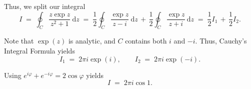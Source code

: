 \documentclass[10pt]{article}
\begin{document}
        Thus, we split our integral
        \[
        I \;=\; \oint_C \frac{z \exp{z}}{z^2 + 1} \:\mathrm{d}z \;=\; \frac{1}{2}\oint_C \frac{\exp{z}}{z - i} \:\mathrm{d}z 
                \,+\, \frac{1}{2}\oint_C \frac{\exp{z}}{z + i} \:\mathrm{d}z \;=\; \frac{1}{2}I_1 \,+\, \frac{1}{2}I_2.
        \]

        Note that $\exp(z)$ is analytic, and $C$ contains both $i$ and $-i$. Thus, Cauchy's Integral Formula yields
        \[
        I_1 \;=\; 2\pi i \exp(i), \quad\quad I_2 \;=\; 2\pi i \exp(-i).
        \]

        Using $e^{i\varphi} + e^{-i\varphi} = 2\cos{\varphi}$ yields 
        \[
        I \;=\; 2 \pi i \cos{1}.
        \]
        
\end{document}
